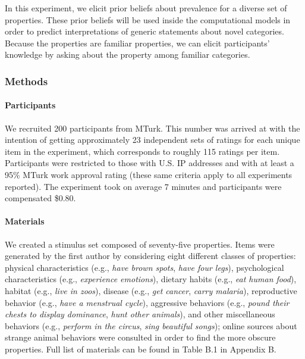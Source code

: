 \documentclass[floatsintext,doc]{apa6}
\let\oldparagraph\paragraph
\renewcommand{\paragraph}[1]{\oldparagraph{#1}\mbox{}}
\begin{document}
In this experiment, we elicit prior beliefs about prevalence for a diverse set of properties.
These prior beliefs will be used inside the computational models in order to predict interpretations of generic statements about novel categories. %
Because the properties are familiar properties, we can elicit participants' knowledge by asking about the property among familiar  categories.

\hypertarget{methods}{%
\subsubsection{Methods}\label{methods}}

\hypertarget{participants-1}{%
\paragraph{Participants}\label{participants-1}}

We recruited 200 participants from MTurk.
This number was arrived at with the intention of getting approximately 23 independent sets of ratings for each unique item in the experiment, which corresponds to roughly 115 ratings per item.
Participants were restricted to those with U.S. IP addresses and with at least a 95\% MTurk work approval rating (these same criteria apply to all experiments reported).
The experiment took on average 7 minutes and participants were compensated \$0.80.

\hypertarget{materials}{%
\paragraph{Materials}\label{materials}}
We created a stimulus set composed of seventy-five properties.
Items were generated by the first author by considering eight different classes of properties: physical characteristics (e.g., \emph{have brown spots}, \emph{have four legs}), psychological characteristics (e.g., \emph{experience emotions}), dietary habits (e.g., \emph{eat human food}), habitat (e.g., \emph{live in zoos}), disease (e.g., \emph{get cancer}, \emph{carry malaria}), reproductive behavior (e.g., \emph{have a menstrual cycle}), aggressive behaviors (e.g., \emph{pound their chests to display dominance}, \emph{hunt other animals}), and other miscellaneous behaviors (e.g., \emph{perform in the circus}, \emph{sing beautiful songs}); online sources about strange animal behaviors were consulted in order to find the more obscure properties. Full list of materials can be found in Table B.1 in Appendix B.
\end{document}
